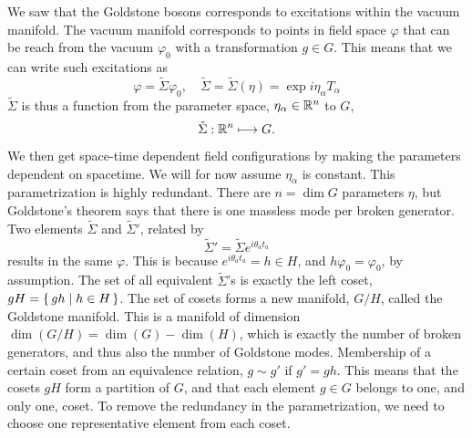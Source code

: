 We saw that the Goldstone bosons corresponds to excitations within the vacuum manifold.
The vacuum manifold corresponds to points in field space $\varphi$ that can be reach from the vacuum $\varphi_0$ with a transformation $g \in G$.
This means that we can write such excitations as
\begin{equation}
    \varphi = \tilde\Sigma \varphi_0, \quad \tilde \Sigma = \tilde \Sigma(\eta) = \exp{i \eta_\alpha T_\alpha}
\end{equation}
$\tilde \Sigma$ is thus a function from the parameter space, $\eta_\alpha \in \mathbb{R}^n$ to $G$,
\begin{align}
    \tilde \Sigma: \mathbb{R}^n \longmapsto G.
\end{align}
We then get space-time dependent field configurations by making the parameters dependent on spacetime.
We will for now assume $\eta_\alpha$ is constant.
This parametrization is highly redundant.
There are $n = \dim G$ parameters $\eta$, but Goldstone's theorem says that there is one massless mode per broken generator.
Two elements $\tilde\Sigma$ and $\tilde\Sigma'$, related by
\begin{equation}
    \tilde \Sigma' = \tilde\Sigma e^{i \theta_a t_a}
\end{equation}
results in the same $\varphi$.
This is because  $e^{i \theta_a t_a} = h \in H$, and $h \varphi_0 = \varphi_0$, by assumption.
The set of all equivalent $\tilde \Sigma$'s is exactly the left coset, $gH = \left\{\, gh \mid  h \in H \,\right\}$.
The set of cosets forms a new manifold, $G / H$, called the Goldstone manifold.
This is a manifold of dimension $\dim(G/H) = \dim(G) - \dim(H)$, which is exactly the number of broken generators, and thus also the number of Goldstone modes.
Membership of a certain coset from an equivalence relation, $g \sim g'$ if $g' = gh$.
This means that the cosets $gH$ form a partition of $G$, and that each element $g \in G$ belongs to one, and only one, coset.
To remove the redundancy in the parametrization, we need to choose one representative element from each coset.

